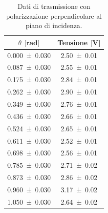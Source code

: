 \documentclass[a4paper]{article}
\begin{document}
\begin{table}[htbp]
\centering
\caption{Dati di trasmissione con polarizzazione perpendicolare al piano di incidenza.}
\label{tab:brewster_perp}
\begin{tabular}{|c|c|}
\hline
$\theta$ [\si{\radian}] & Tensione [\si{\volt}] \\\hline\hline
\SI{0.000 \pm 0.030}{} & \SI{2.50 \pm 0.01}{} \\
\SI{0.087 \pm 0.030}{} & \SI{2.55 \pm 0.01}{} \\
\SI{0.175 \pm 0.030}{} & \SI{2.84 \pm 0.01}{} \\
\SI{0.262 \pm 0.030}{} & \SI{2.90 \pm 0.01}{} \\
\SI{0.349 \pm 0.030}{} & \SI{2.76 \pm 0.01}{} \\
\SI{0.436 \pm 0.030}{} & \SI{2.66 \pm 0.01}{} \\
\SI{0.524 \pm 0.030}{} & \SI{2.65 \pm 0.01}{} \\
\SI{0.611 \pm 0.030}{} & \SI{2.52 \pm 0.01}{} \\
\SI{0.698 \pm 0.030}{} & \SI{2.56 \pm 0.01}{} \\
\SI{0.785 \pm 0.030}{} & \SI{2.71 \pm 0.02}{} \\
\SI{0.873 \pm 0.030}{} & \SI{2.86 \pm 0.02}{} \\
\SI{0.960 \pm 0.030}{} & \SI{3.17 \pm 0.02}{} \\
\SI{1.050 \pm 0.030}{} & \SI{2.64 \pm 0.02}{} \\
\hline
\end{tabular}
\end{table}
\end{document}
